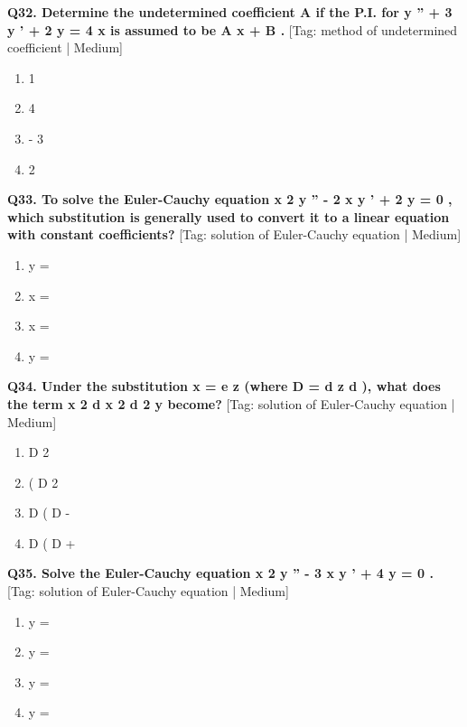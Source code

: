 \noindent\textbf{Q32. Determine the undetermined coefficient A if the P.I. for y '' + 3 y ' + 2 y = 4 x is assumed to be A x + B .} \hfill [Tag: method of undetermined coefficient | Medium]
\begin{enumerate}[label=(\alph*),topsep=2pt,itemsep=1pt,partopsep=0pt,parsep=0pt]
    \item {{1}}
    \item {{4}}
    \item {{- 3}}
    \item {{2}}
\end{enumerate}
\vspace{2mm}

\noindent\textbf{Q33. To solve the Euler-Cauchy equation x 2 y '' - 2 x y ' + 2 y = 0 , which substitution is generally used to convert it to a linear equation with constant coefficients?} \hfill [Tag: solution of Euler-Cauchy equation | Medium]
\begin{enumerate}[label=(\alph*),topsep=2pt,itemsep=1pt,partopsep=0pt,parsep=0pt]
    \item {{y =}}
    \item {{x =}}
    \item {{x =}}
    \item {{y =}}
\end{enumerate}
\vspace{2mm}

\noindent\textbf{Q34. Under the substitution x = e z (where D = d z d ), what does the term x 2 d x 2 d 2 y become?} \hfill [Tag: solution of Euler-Cauchy equation | Medium]
\begin{enumerate}[label=(\alph*),topsep=2pt,itemsep=1pt,partopsep=0pt,parsep=0pt]
    \item {{D 2}}
    \item {{( D 2}}
    \item {{D ( D -}}
    \item {{D ( D +}}
\end{enumerate}
\vspace{2mm}

\noindent\textbf{Q35. Solve the Euler-Cauchy equation x 2 y '' - 3 x y ' + 4 y = 0 .} \hfill [Tag: solution of Euler-Cauchy equation | Medium]
\begin{enumerate}[label=(\alph*),topsep=2pt,itemsep=1pt,partopsep=0pt,parsep=0pt]
    \item {{y =}}
    \item {{y =}}
    \item {{y =}}
    \item {{y =}}
\end{enumerate}
\vspace{2mm}

